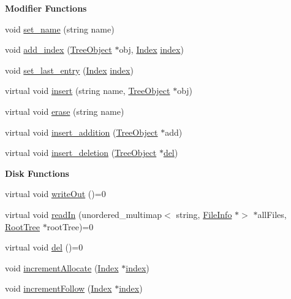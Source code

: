 \begin{Indent}\textbf{ Modifier Functions}\par
\begin{DoxyCompactItemize}
\item 
void \mbox{\hyperlink{classTreeObject_a8ae7e42502b4652102e0b3c4c4e1671b}{set\+\_\+name}} (string name)
\item 
void \mbox{\hyperlink{classTreeObject_af908239ff96a0f3064d0d8aefb58381b}{add\+\_\+index}} (\mbox{\hyperlink{classTreeObject}{Tree\+Object}} $\ast$obj, \mbox{\hyperlink{structindex}{Index}} \mbox{\hyperlink{structindex}{index}})
\item 
void \mbox{\hyperlink{classTreeObject_a2ec94bc9d2647275049ddf2a70b8510e}{set\+\_\+last\+\_\+entry}} (\mbox{\hyperlink{structindex}{Index}} \mbox{\hyperlink{structindex}{index}})
\item 
virtual void \mbox{\hyperlink{classTreeObject_af8cc57edba9f435b52ccf33cfbbb2fc6}{insert}} (string name, \mbox{\hyperlink{classTreeObject}{Tree\+Object}} $\ast$obj)
\item 
virtual void \mbox{\hyperlink{classTreeObject_a453b5df2a9ef7c6faad259900d574ee2}{erase}} (string name)
\item 
virtual void \mbox{\hyperlink{classTreeObject_a41ce6080e0df5adcea4b0a76d35af885}{insert\+\_\+addition}} (\mbox{\hyperlink{classTreeObject}{Tree\+Object}} $\ast$add)
\item 
virtual void \mbox{\hyperlink{classTreeObject_afcc4b3928d2b77ff080aa229a9706215}{insert\+\_\+deletion}} (\mbox{\hyperlink{classTreeObject}{Tree\+Object}} $\ast$\mbox{\hyperlink{classTreeObject_af390b7479aa972888e594c07a85740b6}{del}})
\end{DoxyCompactItemize}
\end{Indent}
\begin{Indent}\textbf{ Disk Functions}\par
\begin{DoxyCompactItemize}
\item 
virtual void \mbox{\hyperlink{classTreeObject_abf2bf88337bec961784b5dfeb9b795ed}{write\+Out}} ()=0
\item 
virtual void \mbox{\hyperlink{classTreeObject_a8247e79f2b4c1760649ac6f1af1c583f}{read\+In}} (unordered\+\_\+multimap$<$ string, \mbox{\hyperlink{classFileInfo}{File\+Info}} $\ast$$>$ $\ast$all\+Files, \mbox{\hyperlink{classRootTree}{Root\+Tree}} $\ast$root\+Tree)=0
\item 
virtual void \mbox{\hyperlink{classTreeObject_af390b7479aa972888e594c07a85740b6}{del}} ()=0
\item 
void \mbox{\hyperlink{classTreeObject_a0660e393ded8a24c5a7e211ad7891de3}{increment\+Allocate}} (\mbox{\hyperlink{structindex}{Index}} $\ast$\mbox{\hyperlink{structindex}{index}})
\item 
void \mbox{\hyperlink{classTreeObject_a1a58b541ca7c6d442c0fd7a0f587cfdc}{increment\+Follow}} (\mbox{\hyperlink{structindex}{Index}} $\ast$\mbox{\hyperlink{structindex}{index}})
\end{DoxyCompactItemize}
\end{Indent}
